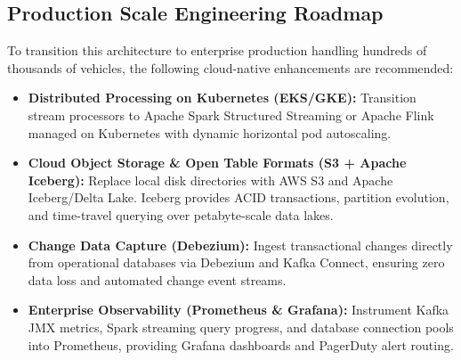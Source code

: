 \documentclass[11pt,a4paper]{article}
\begin{document}
\subsection{Production Scale Engineering Roadmap}
To transition this architecture to enterprise production handling hundreds of thousands of vehicles, the following cloud-native enhancements are recommended:
\begin{itemize}
    \item \textbf{Distributed Processing on Kubernetes (EKS/GKE):} Transition stream processors to Apache Spark Structured Streaming or Apache Flink managed on Kubernetes with dynamic horizontal pod autoscaling.
    \item \textbf{Cloud Object Storage \& Open Table Formats (S3 + Apache Iceberg):} Replace local disk directories with AWS S3 and Apache Iceberg/Delta Lake. Iceberg provides ACID transactions, partition evolution, and time-travel querying over petabyte-scale data lakes.
    \item \textbf{Change Data Capture (Debezium):} Ingest transactional changes directly from operational databases via Debezium and Kafka Connect, ensuring zero data loss and automated change event streams.
    \item \textbf{Enterprise Observability (Prometheus \& Grafana):} Instrument Kafka JMX metrics, Spark streaming query progress, and database connection pools into Prometheus, providing Grafana dashboards and PagerDuty alert routing.
\end{itemize}
\clearpage
\end{document}
